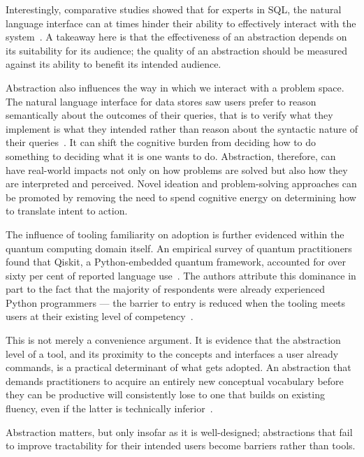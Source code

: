 Interestingly, comparative studies showed that for experts in SQL, the natural language interface can at times hinder their ability to effectively interact with the system~\cite{IpeirotisZheng2025NLIDBUsers}.
A takeaway here is that the effectiveness of an abstraction depends on its suitability for its audience; the quality of an abstraction should be measured against its ability to benefit its intended audience.

Abstraction also influences the way in which we interact with a problem space.
The natural language interface for data stores saw users prefer to reason semantically about the outcomes of their queries, that is to verify what they implement is what they intended rather than reason about the syntactic nature of their queries~\cite{IpeirotisZheng2025NLIDBUsers}.
It can shift the cognitive burden from deciding how to do something to deciding what it is one wants to do.
Abstraction, therefore, can have real-world impacts not only on how problems are solved but also how they are interpreted and perceived.
Novel ideation and problem-solving approaches can be promoted by removing the need to spend cognitive energy on determining how to translate intent to action.

The influence of tooling familiarity on adoption is further evidenced within the quantum computing domain itself.
An empirical survey of quantum practitioners found that Qiskit, a Python-embedded quantum framework, accounted for over sixty per cent of reported language use~\cite{ferreira2024qplusage}.
The authors attribute this dominance in part to the fact that the majority of respondents were already experienced Python programmers — the barrier to entry is reduced when the tooling meets users at their existing level of competency~\cite{ferreira2024qplusage}.

This is not merely a convenience argument.
It is evidence that the abstraction level of a tool, and its proximity to the concepts and interfaces a user already commands, is a practical determinant of what gets adopted.
An abstraction that demands practitioners to acquire an entirely new conceptual vocabulary before they can be productive will consistently lose to one that builds on existing fluency, even if the latter is technically inferior~\cite{ferreira2024qplusage}.

Abstraction matters, but only insofar as it is well-designed; abstractions that fail to improve tractability for their intended users become barriers rather than tools.

